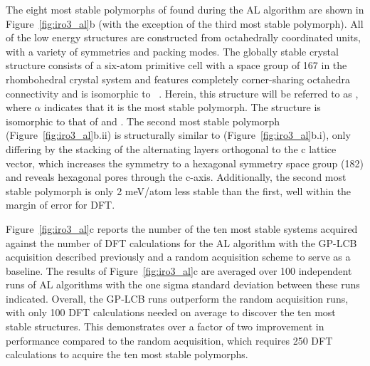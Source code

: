 %
The eight most stable polymorphs of \IrOthree found during the AL algorithm are shown in Figure~\ref{fig:iro3_al}b (with the exception of the third most stable polymorph).
%
All of the low energy \IrOthree structures are constructed from octahedrally coordinated units, with a variety of symmetries and packing modes.
%
The globally stable crystal structure consists of a six-atom primitive cell with a space group of \num{167} in the rhombohedral crystal system and features completely corner-sharing octahedra connectivity and is isomorphic to ~\cite{Hepworth1957}.
%
Herein, this structure will be referred to as \aIrOthree, where $\alpha$ indicates that it is the most stable \IrOthree polymorph.
%
The structure is isomorphic to that of  and .
%
The second most stable polymorph
(Figure~\ref{fig:iro3_al}b.ii)
is structurally similar to
\aIrOthree (Figure~\ref{fig:iro3_al}b.i),
only differing by the stacking of the alternating layers orthogonal to the c lattice vector,
which increases the symmetry to a hexagonal symmetry space group (182) and reveals hexagonal pores through the c-axis.
%
Additionally, the second most stable polymorph is only 2 meV/atom less stable than the first, well within the margin of error for DFT.


%
%
Figure~\ref{fig:iro3_al}c reports the number of the ten most stable systems acquired against the number of DFT calculations for the AL algorithm with the GP-LCB acquisition described previously and a random acquisition scheme to serve as a baseline.
%
The results of Figure~\ref{fig:iro3_al}c are averaged over 100 independent runs of AL algorithms with the one sigma standard deviation between these runs indicated.
%
Overall, the GP-LCB runs outperform the random acquisition runs, with only \num{100} DFT calculations needed on average to discover the ten most stable structures.
%
This demonstrates over a factor of two improvement in performance compared to the random acquisition, which requires \mytilde\num{250} DFT calculations to acquire the ten most stable polymorphs.


